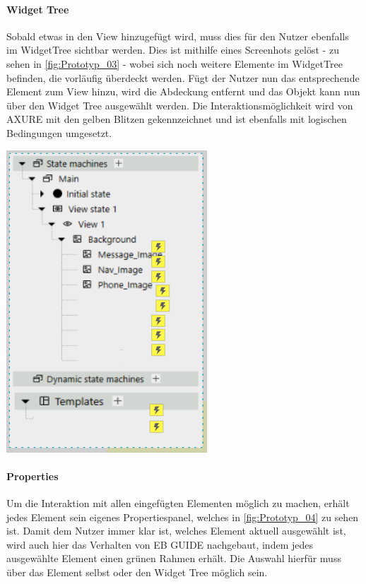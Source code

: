 \paragraph{Widget Tree}
Sobald etwas in den View hinzugefügt wird, muss dies für den Nutzer ebenfalls im WidgetTree sichtbar werden.
Dies ist mithilfe eines Screenhots gelöst - zu sehen in \cref{fig:Prototyp_03} -  wobei sich noch weitere Elemente im WidgetTree befinden, die vorläufig überdeckt werden.
Fügt der Nutzer nun das entsprechende Element zum View hinzu, wird die Abdeckung entfernt und das Objekt kann nun über den Widget Tree ausgewählt werden.
Die Interaktionsmöglichkeit wird von AXURE mit den gelben Blitzen gekennzeichnet und ist ebenfalls mit logischen Bedingungen umgesetzt.

\begin{center}
  \includegraphics[scale=0.8]{figures/Prototyp_03.PNG}
  \label{fig:Prototyp_03}
\end{center}

\paragraph{Properties}
Um die Interaktion mit allen eingefügten Elementen möglich zu machen, erhält jedes Element sein eigenes Propertiespanel, welches in \cref{fig:Prototyp_04} zu sehen ist.
Damit dem Nutzer immer klar ist, welches Element aktuell ausgewählt ist, wird auch hier das Verhalten von EB GUIDE nachgebaut, indem jedes ausgewählte Element einen grünen Rahmen erhält.
Die Auswahl hierfür muss über das Element selbst oder den Widget Tree möglich sein.

